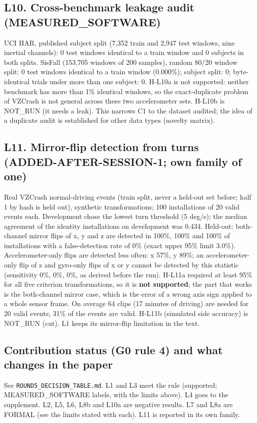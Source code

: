 \subsection*{L10. Cross-benchmark leakage audit (MEASURED\_SOFTWARE)}

UCI HAR, published subject split (7,352 train and 2,947 test windows, nine inertial channels): 0 test windows identical to a train window and 0 subjects in both splits. SisFall (153,705 windows of 200 samples), random 80/20 window split: 0 test windows identical to a train window (0.000\%); subject split: 0; byte-identical trials under more than one subject: 0. H-L10a is not supported: neither benchmark has more than 1\% identical windows, so the exact-duplicate problem of VZCrash is not general across these two accelerometer sets. H-L10b is NOT\_RUN (it needs a leak). This narrows C1 to the dataset audited; the idea of a duplicate audit is established for other data types (novelty matrix).

\subsection*{L11. Mirror-flip detection from turns (ADDED-AFTER-SESSION-1; own family of one)}

Real VZCrash normal-driving events (train split, never a held-out set before; half 1 by hash is held out), synthetic transformations; 100 installations of 20 valid events each. Development chose the lowest turn threshold (5 deg/s); the median agreement of the identity installations on development was 0.434. Held-out: both-channel mirror flips of x, y and z are detected in 100\%, 100\% and 100\% of installations with a false-detection rate of 0\% (exact upper 95\% limit 3.0\%). Accelerometer-only flips are detected less often: x 57\%, y 89\%; an accelerometer-only flip of z and gyro-only flips of x or y cannot be detected by this statistic (sensitivity 0\%, 0\%, 0\%, as derived before the run). H-L11a required at least 95\% for all five criterion transformations, so it is \textbf{not supported}; the part that works is the both-channel mirror case, which is the error of a wrong axis sign applied to a whole sensor frame. On average 64 clips (17 minutes of driving) are needed for 20 valid events; 31\% of the events are valid. H-L11b (simulated side accuracy) is NOT\_RUN (cut). L1 keeps its mirror-flip limitation in the text.

\subsection*{Contribution status (G0 rule 4) and what changes in the paper}

See \texttt{ROUND5\_DECISION\_TABLE.md}. L1 and L3 meet the rule (supported; MEASURED\_SOFTWARE labels, with the limits above). L4 goes to the supplement. L2, L5, L6, L8b and L10a are negative results. L7 and L8a are FORMAL (see the limits stated with each). L11 is reported in its own family.

